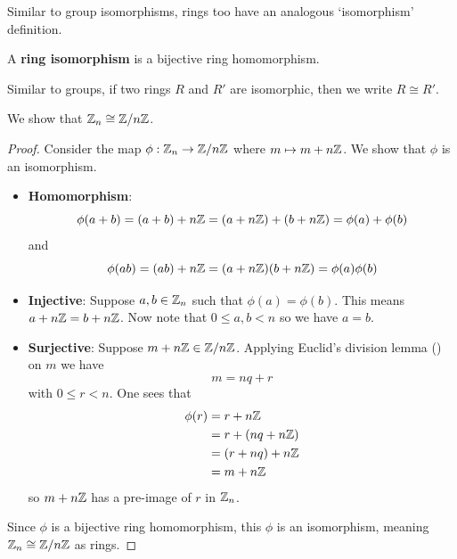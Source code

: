 Similar to group isomorphisms, rings too have an analogous `isomorphism' definition.
\begin{definition}
    A \textbf{ring isomorphism} is a bijective ring homomorphism.
\end{definition}
Similar to groups, if two rings $R$ and $R'$ are isomorphic, then we write $R \cong R'$.

\begin{example}
    We show that $\mathbb{Z}_n \cong \mathbb{Z}/n\mathbb{Z}$.

    \begin{proof}
        Consider the map $\phi:\mathbb{Z}_n \to \mathbb{Z}/n\mathbb{Z}$ where $m \mapsto m + n\mathbb{Z}$. We show that $\phi$ is an isomorphism.
        \begin{itemize}
            \item \textbf{Homomorphism}:
            \[
                \phi(a+b) = (a+b) + n\mathbb{Z} = (a + n\mathbb{Z}) + (b + n\mathbb{Z}) = \phi(a) + \phi(b)
            \]
            and
            \[
                \phi(ab) = (ab) + n\mathbb{Z} = (a+n\mathbb{Z})(b+n\mathbb{Z}) = \phi(a)\phi(b)
            \]

            \item \textbf{Injective}: Suppose $a, b \in \mathbb{Z}_n$ such that $\phi(a) = \phi(b)$. This means $a + n\mathbb{Z} = b + n\mathbb{Z}$. Now note that $0 \leq a,b < n$ so we have $a = b$.
            
            \item \textbf{Surjective}: Suppose $m + n\mathbb{Z} \in \mathbb{Z}/n\mathbb{Z}$. Applying Euclid's division lemma () on $m$ we have
            \[
                m = nq + r
            \]
            with $0 \leq r < n$. One sees that
            \begin{align*}
                \phi(r) &= r + n\mathbb{Z}\\
                &= r + (nq + n\mathbb{Z})\\
                &= (r + nq) + n\mathbb{Z}\\
                &= m + n\mathbb{Z}
            \end{align*}
            so $m + n\mathbb{Z}$ has a pre-image of $r$ in $\mathbb{Z}_n$.
        \end{itemize}
        Since $\phi$ is a bijective ring homomorphism, this $\phi$ is an isomorphism, meaning $\mathbb{Z}_n \cong \mathbb{Z}/n\mathbb{Z}$ as rings.
    \end{proof}
\end{example}
